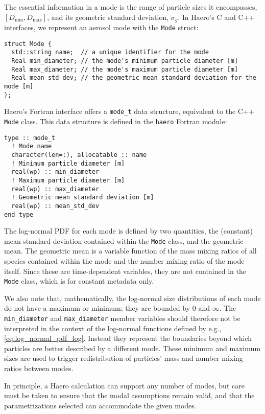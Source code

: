 The essential information in a mode is the range of particle sizes it
encompasses, $[D_{\min}, D_{\max}]$, and its geometric standard deviation,
$\sigma_g$. In Haero's C and C++ interfaces,
we represent an aerosol mode with the \texttt{Mode} struct:

\begin{lstlisting}
struct Mode {
  std::string name;  // a unique identifier for the mode
  Real min_diameter; // the mode's minimum particle diameter [m]
  Real max_diameter; // the mode's maximum particle diameter [m]
  Real mean_std_dev; // the geometric mean standard deviation for the mode [m]
};
\end{lstlisting}

Haero's Fortran interface offers a \texttt{mode\_t} data structure, equivalent to
the C++ \texttt{Mode} class. This data structure is defined in the \texttt{haero}
Fortran module:

\begin{lstlisting}
type :: mode_t
  ! Mode name
  character(len=:), allocatable :: name
  ! Minimum particle diameter [m]
  real(wp) :: min_diameter
  ! Maximum particle diameter [m]
  real(wp) :: max_diameter
  ! Geometric mean standard deviation [m]
  real(wp) :: mean_std_dev
end type
\end{lstlisting}

The log-normal PDF for each mode is defined by two quantities, the (constant) mean standard deviation contained within the \texttt{Mode} class, and the geometric mean.
The geometric mean is a variable function of the mass mixing ratios of all species contained within the mode and the number mixing ratio of the mode itself. 
Since these are time-dependent variables, they are not contained in the \texttt{Mode} class, which is for constant metadata only.

We also note that, mathematically, the log-normal size distributions of each mode do not have a maximum or minimum; they are bounded by 0 and $\infty$.
The \texttt{min\_diameter} and \texttt{max\_diameter} member variables should therefore not be interpreted in the context of the log-normal functions defined by e.g., \eqref{eq:log_normal_pdf_log}.
Instead they represent the boundaries beyond which particles are better described by a different mode.  
These minimum and maximum sizes are used to trigger redistribution of particles' mass and number mixing ratios between modes.

In principle, a Haero calculation can support any number of modes, but care
must be taken to ensure that the modal assumptions remain valid, and that
the parametrizations selected can accommodate the given modes.

